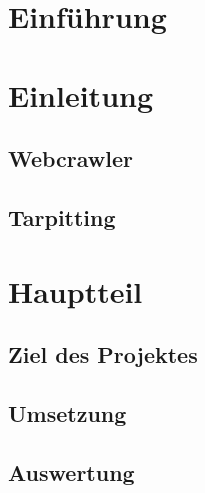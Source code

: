 \documentclass[listof=totoc, bibliography=totoc]{scrartcl}
\begin{document}
	
	
	\setcounter{page}{1}
	
	
	\tableofcontents
	\newpage
	\setcounter{page}{1}
	\section{Einführung}
	
	
	\section{Einleitung}
	\subsection{Webcrawler}
	
	
	
	
	\subsection{Tarpitting}
	
	
	
	\section{Hauptteil}
	\subsection{Ziel des Projektes}
	
	\subsection{Umsetzung}
	
	
	
	
	\subsection{Auswertung}
	
	
	
\end{document}
